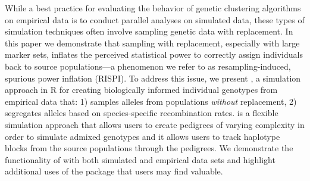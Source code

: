 

While a best practice for evaluating the behavior of genetic clustering algorithms 
on empirical data is to conduct parallel analyses on simulated data, these types 
of simulation techniques often involve sampling genetic data with replacement. 
In this paper we demonstrate that sampling with replacement, especially with large 
marker sets, inflates the perceived statistical power to correctly assign individuals 
back to source populations---a phenomenon we refer to as resampling-induced, 
spurious power inflation (RISPI). To address this issue, we present \gscramble{}, a 
simulation approach in R for creating biologically informed individual genotypes from 
empirical data that: 1) samples alleles from populations \textit{without} replacement, 
2) segregates alleles based on species-specific recombination rates. \gscramble{} is 
a flexible simulation approach that allows users to create pedigrees of varying complexity 
in order to simulate admixed genotypes and it allows users to track haplotype blocks 
from the source populations through the pedigrees. We demonstrate the functionality of 
\gscramble{} with both simulated and empirical data sets and highlight additional uses of 
the package that users may find valuable.